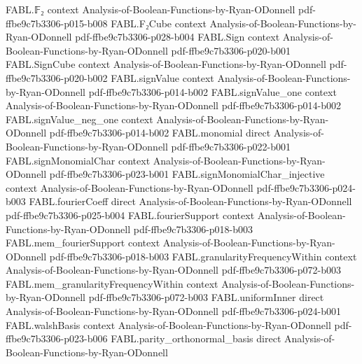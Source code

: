 \begin{theorem}
\label{FABL.card_blrTruthTableVariables}
\leanok
{}
\proofstep
  {FABL.𝔽₂}
  {context}
  {Analysis-of-Boolean-Functions-by-Ryan-ODonnell}
  {pdf-ffbe9c7b3306-p015-b008}
\proofstep
  {FABL.F₂Cube}
  {context}
  {Analysis-of-Boolean-Functions-by-Ryan-ODonnell}
  {pdf-ffbe9c7b3306-p028-b004}
\proofstep
  {FABL.Sign}
  {context}
  {Analysis-of-Boolean-Functions-by-Ryan-ODonnell}
  {pdf-ffbe9c7b3306-p020-b001}
\proofstep
  {FABL.SignCube}
  {context}
  {Analysis-of-Boolean-Functions-by-Ryan-ODonnell}
  {pdf-ffbe9c7b3306-p020-b002}
\proofstep
  {FABL.signValue}
  {context}
  {Analysis-of-Boolean-Functions-by-Ryan-ODonnell}
  {pdf-ffbe9c7b3306-p014-b002}
\proofstep
  {FABL.signValue_one}
  {context}
  {Analysis-of-Boolean-Functions-by-Ryan-ODonnell}
  {pdf-ffbe9c7b3306-p014-b002}
\proofstep
  {FABL.signValue_neg_one}
  {context}
  {Analysis-of-Boolean-Functions-by-Ryan-ODonnell}
  {pdf-ffbe9c7b3306-p014-b002}
\proofstep
  {FABL.monomial}
  {direct}
  {Analysis-of-Boolean-Functions-by-Ryan-ODonnell}
  {pdf-ffbe9c7b3306-p022-b001}
\proofstep
  {FABL.signMonomialChar}
  {context}
  {Analysis-of-Boolean-Functions-by-Ryan-ODonnell}
  {pdf-ffbe9c7b3306-p023-b001}
\proofstep
  {FABL.signMonomialChar_injective}
  {context}
  {Analysis-of-Boolean-Functions-by-Ryan-ODonnell}
  {pdf-ffbe9c7b3306-p024-b003}
\proofstep
  {FABL.fourierCoeff}
  {direct}
  {Analysis-of-Boolean-Functions-by-Ryan-ODonnell}
  {pdf-ffbe9c7b3306-p025-b004}
\proofstep
  {FABL.fourierSupport}
  {context}
  {Analysis-of-Boolean-Functions-by-Ryan-ODonnell}
  {pdf-ffbe9c7b3306-p018-b003}
\proofstep
  {FABL.mem_fourierSupport}
  {context}
  {Analysis-of-Boolean-Functions-by-Ryan-ODonnell}
  {pdf-ffbe9c7b3306-p018-b003}
\proofstep
  {FABL.granularityFrequencyWithin}
  {context}
  {Analysis-of-Boolean-Functions-by-Ryan-ODonnell}
  {pdf-ffbe9c7b3306-p072-b003}
\proofstep
  {FABL.mem_granularityFrequencyWithin}
  {context}
  {Analysis-of-Boolean-Functions-by-Ryan-ODonnell}
  {pdf-ffbe9c7b3306-p072-b003}
\proofstep
  {FABL.uniformInner}
  {direct}
  {Analysis-of-Boolean-Functions-by-Ryan-ODonnell}
  {pdf-ffbe9c7b3306-p024-b001}
\proofstep
  {FABL.walshBasis}
  {context}
  {Analysis-of-Boolean-Functions-by-Ryan-ODonnell}
  {pdf-ffbe9c7b3306-p023-b006}
\proofstep
  {FABL.parity_orthonormal_basis}
  {direct}
  {Analysis-of-Boolean-Functions-by-Ryan-ODonnell}

\end{theorem}
